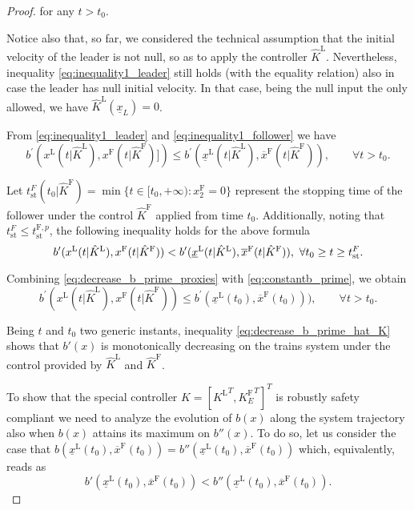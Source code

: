 \documentclass[letterpaper, 10 pt, conference]{ieeeconf}
\theoremstyle{definition}
\theoremstyle{nopoint}
\begin{document}
\begin{proof}
	for any $t>t_0$.
	
	Notice also that, so far, we considered the technical assumption that the initial velocity of the leader is not null, so as to apply the controller $\hat{K}^\mathrm{L}$. Nevertheless, inequality \eqref{eq:inequality1_leader} still holds (with the equality relation) also in case the leader has null initial velocity. In that case, being the null input the only allowed, we have $\hat{K}^\mathrm{L}(\underline{x}_L)=0$.
	
	From \eqref{eq:inequality1_leader} and \eqref{eq:inequality1_follower} we have 
	\begin{equation}\label{eq:decrease_b_prime_proxies}
		b^\prime(x^\mathrm{L}(t | \hat{K}^\mathrm{L}),x^\mathrm{F}(t |\hat{K}^\mathrm{F})])\leq  b^\prime(\underline{x}^\mathrm{L}(t | \hat{K}^\mathrm{L}),\overline{x}^\mathrm{F}(t | \hat{K}^\mathrm{F})), \qquad \forall t>t_0. 
	\end{equation}
	
Let $t_{\mathrm{st}}^{F}(t_0 | \hat{K}^\mathrm{F}) = \min\{t \in [t_0, +\infty) : x_2^\mathrm{F} = 0\}$ represent the stopping time of the follower under the control $\hat{K}^\mathrm{F}$ applied from time $t_0$. Additionally, noting that $t_{\mathrm{st}}^{F} \leq t_{\mathrm{st}}^{\mathrm{F},p}$, the following inequality holds for the above formula
	\begin{equation*}
		b^\prime(x^\mathrm{L}(t | \hat{K}^\mathrm{L}),x^\mathrm{F}(t |\hat{K}^\mathrm{F}))<  b^\prime(\underline{x}^\mathrm{L}(t | \hat{K}^\mathrm{L}),\overline{x}^\mathrm{F}(t | \hat{K}^\mathrm{F})), \,\, \forall t_0\geq t\geq t_{\mathrm{st}}^{F} \\ . 
	\end{equation*}

	
	Combining \eqref{eq:decrease_b_prime_proxies}  with \eqref{eq:constantb_prime}, we obtain 
	\begin{equation}\label{eq:decrease_b_prime_hat_K}
		b^\prime(x^\mathrm{L}(t | \hat{K}^\mathrm{L}),x^\mathrm{F}(t | \hat{K}^\mathrm{F}))\leq b^\prime(\underline{x}^\mathrm{L}(t_0),\overline{x}^\mathrm{F}(t_0))), \qquad \forall t>t_0. 
	\end{equation}
	
	Being $t$ and $t_0$ two generic instants, inequality \eqref{eq:decrease_b_prime_hat_K} shows that $b'(x)$ is monotonically decreasing on the trains system under the control provided by $\hat{K}^\mathrm{L}$ and  $\hat{K}^\mathrm{F}$.
	
	To show that the special controller $K=[{K^\mathrm{L}}^T, {K^\mathrm{F}_E}^T]^T$ is robustly safety compliant
	we need to analyze the evolution of $b(x)$ along the system trajectory also when $b(x)$ attains its maximum on $b''(x)$. 
	To do so, let us consider the case that $b(\underline{x}^\mathrm{L}(t_0),\overline{x}^\mathrm{F}(t_0))=b''(\underline{x}^\mathrm{L}(t_0),\overline{x}^\mathrm{F}(t_0))$ which, equivalently, reads as
	\begin{equation}\label{eq:comparison_b_prime_b_second}
		b'(\underline{x}^\mathrm{L}(t_0),\overline{x}^\mathrm{F}(t_0)) <b''(\underline{x}^\mathrm{L}(t_0),\overline{x}^\mathrm{F}(t_0)).
	\end{equation} 
	

\end{proof}
\end{document}
